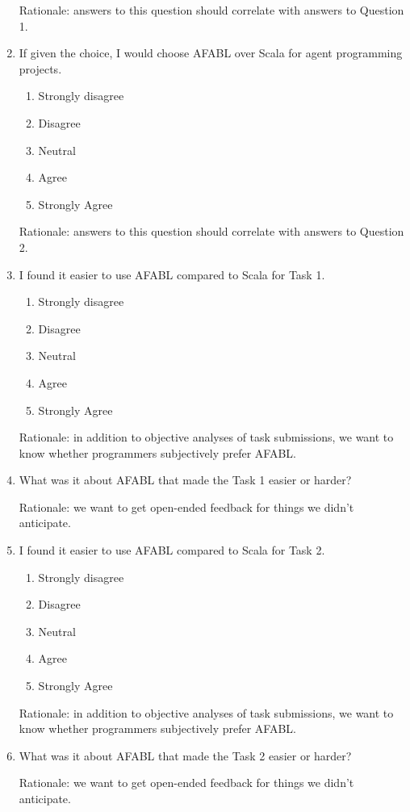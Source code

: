 \begin{enumerate}
Rationale: answers to this question should correlate with answers to Question 1.

\item If given the choice, I would choose AFABL over Scala for agent programming projects.

\begin{enumerate}
\item Strongly disagree
\item Disagree
\item Neutral
\item Agree
\item Strongly Agree
\end{enumerate}

Rationale: answers to this question should correlate with answers to Question 2.

\item I found it easier to use AFABL compared to Scala for Task 1.

\begin{enumerate}
\item Strongly disagree
\item Disagree
\item Neutral
\item Agree
\item Strongly Agree
\end{enumerate}

Rationale: in addition to objective analyses of task submissions, we want to know whether programmers subjectively prefer AFABL.

\item What was it about AFABL that made the Task 1 easier or harder?

Rationale: we want to get open-ended feedback for things we didn’t anticipate.

\item I found it easier to use AFABL compared to Scala for Task 2.

\begin{enumerate}
\item Strongly disagree
\item Disagree
\item Neutral
\item Agree
\item Strongly Agree
\end{enumerate}

Rationale: in addition to objective analyses of task submissions, we want to know whether programmers subjectively prefer AFABL.

\item What was it about AFABL that made the Task 2 easier or harder?

Rationale: we want to get open-ended feedback for things we didn’t anticipate.

\end{enumerate}


